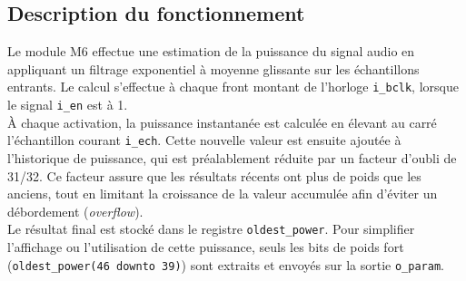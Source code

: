 

\subsection{Description du fonctionnement}

Le module M6 effectue une estimation de la puissance du signal audio en
appliquant un filtrage exponentiel à moyenne glissante sur les échantillons
entrants. Le calcul s'effectue à chaque front montant de l'horloge
\verb|i_bclk|, lorsque le signal \verb|i_en| est à 1. \\

À chaque activation, la puissance instantanée est calculée en élevant au
carré l'échantillon courant \verb|i_ech|. Cette nouvelle valeur est ensuite
ajoutée à l'historique de puissance, qui est préalablement réduite par un
facteur d'oubli de 31/32. Ce facteur assure que les résultats récents ont
plus de poids que les anciens, tout en limitant la croissance de la valeur
accumulée afin d'éviter un débordement (\emph{overflow}). \\

Le résultat final est stocké dans le registre \verb|oldest_power|. Pour
simplifier l'affichage ou l'utilisation de cette puissance, seuls les bits de
poids fort (\verb|oldest_power(46 downto 39)|) sont extraits et envoyés sur
la sortie \verb|o_param|. \\


